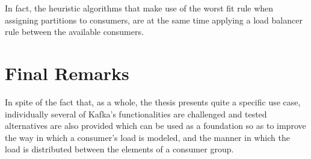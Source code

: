 In fact, the heuristic algorithms that make use of the worst fit rule when assigning partitions to consumers, are at the same time applying a load balancer rule between the available consumers.

\section{Final Remarks}

In spite of the fact that, as a whole, the thesis presents quite a specific use case, individually several of Kafka's functionalities are challenged and tested alternatives are also provided which can be used as a foundation so as to improve the way in which a consumer's load is modeled, and the manner in which the load is distributed between the elements of a consumer group.